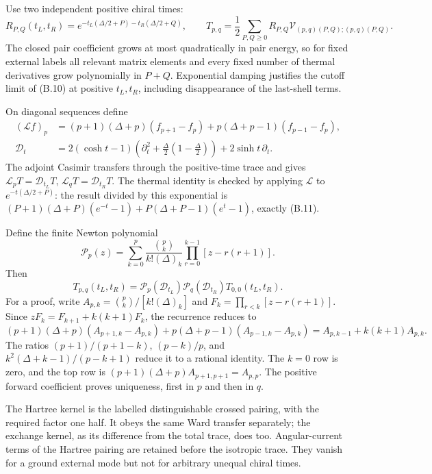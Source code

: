 \documentclass[a4paper,11pt]{article}
\numberwithin{equation}{section}
\begin{document}
Use two independent positive chiral times: \[
R_{P,Q}(t_L,t_R)=e^{-t_L(\Delta/2+P)-t_R(\Delta/2+Q)},\qquad
T_{p,q}=\frac12\sum_{P,Q\ge0}R_{P,Q}
\mathcal V_{(p,q)(P,Q);(p,q)(P,Q)} .
\] The closed pair coefficient grows at most quadratically in pair energy, so for fixed external labels all relevant matrix elements and every fixed number of thermal derivatives grow polynomially in \(P+Q\). Exponential damping justifies the cutoff limit of (B.10) at positive \(t_L,t_R\), including disappearance of the last-shell terms.

On diagonal sequences define \[
\begin{aligned}
(\mathscr Lf)_p
&=(p+1)(\Delta+p)(f_{p+1}-f_p)
+p(\Delta+p-1)(f_{p-1}-f_p),\\
\mathscr D_t
&=2(\cosh t-1)
\left(\partial_t^2+\frac\Delta2(1-\frac\Delta2)\right)
+2\sinh t\,\partial_t .
\end{aligned}
\tag{B.11}
\] The adjoint Casimir transfers through the positive-time trace and gives \(\mathscr L_pT=\mathscr D_{t_L}T\), \(\mathscr L_qT=\mathscr D_{t_R}T\). The thermal identity is checked by applying \(\mathscr L\) to \(e^{-t(\Delta/2+P)}\): the result divided by this exponential is \((P+1)(\Delta+P)(e^{-t}-1)+P(\Delta+P-1)(e^t-1)\), exactly (B.11).

Define the finite Newton polynomial \[
\mathcal P_p(z)
=\sum_{k=0}^p
\frac{\binom pk}{k!(\Delta)_k}
\prod_{r=0}^{k-1}[z-r(r+1)] .
\tag{B.12}
\] Then \[
\boxed{
T_{p,q}(t_L,t_R)
=\mathcal P_p(\mathscr D_{t_L})
\mathcal P_q(\mathscr D_{t_R})T_{0,0}(t_L,t_R).
}
\tag{B.13}
\] For a proof, write \(A_{p,k}=\binom pk/[k!(\Delta)_k]\) and \(F_k=\prod_{r<k}[z-r(r+1)]\). Since \(zF_k=F_{k+1}+k(k+1)F_k\), the recurrence reduces to \[
(p+1)(\Delta+p)(A_{p+1,k}-A_{p,k})
+p(\Delta+p-1)(A_{p-1,k}-A_{p,k})
=A_{p,k-1}+k(k+1)A_{p,k}.
\tag{B.14}
\] The ratios \((p+1)/(p+1-k)\), \((p-k)/p\), and \(k^2(\Delta+k-1)/(p-k+1)\) reduce it to a rational identity. The \(k=0\) row is zero, and the top row is \((p+1)(\Delta+p)A_{p+1,p+1}=A_{p,p}\). The positive forward coefficient proves uniqueness, first in \(p\) and then in \(q\).

The Hartree kernel is the labelled distinguishable crossed pairing, with the required factor one half. It obeys the same Ward transfer separately; the exchange kernel, as its difference from the total trace, does too. Angular-current terms of the Hartree pairing are retained before the isotropic trace. They vanish for a ground external mode but not for arbitrary unequal chiral times.
\end{document}
